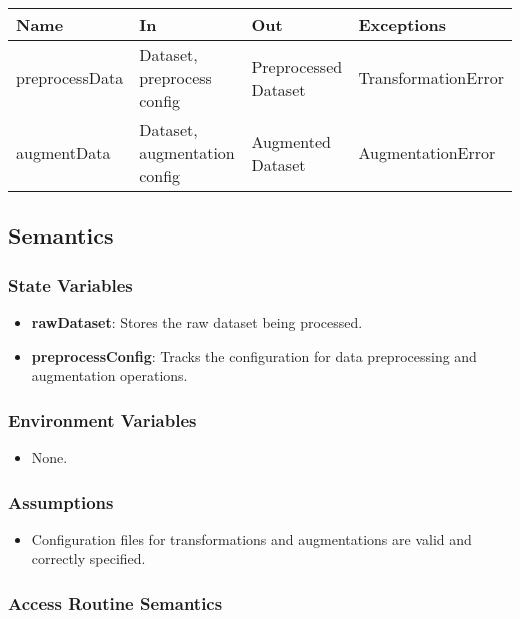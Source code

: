 \documentclass[12pt, titlepage]{article}
\begin{document}
\begin{center}
  \begin{tabular}{p{3cm} p{4cm} p{4cm} p{5cm}}
    \hline
    \textbf{Name} & \textbf{In} & \textbf{Out} & \textbf{Exceptions} \\
    \hline
    preprocessData & Dataset, preprocess config & Preprocessed Dataset & TransformationError \\
    \hline
    augmentData & Dataset, augmentation config & Augmented Dataset & AugmentationError \\
    \hline
  \end{tabular}
\end{center}

\subsection{Semantics}

\subsubsection{State Variables}
\begin{itemize}
    \item \textbf{rawDataset}: Stores the raw dataset being processed.
    \item \textbf{preprocessConfig}: Tracks the configuration for data preprocessing and augmentation operations.
\end{itemize}

\subsubsection{Environment Variables}
\begin{itemize}
    \item None.
\end{itemize}

\subsubsection{Assumptions}
\begin{itemize}
    \item Configuration files for transformations and augmentations are valid and correctly specified.
\end{itemize}

\subsubsection{Access Routine Semantics}
\end{document}

